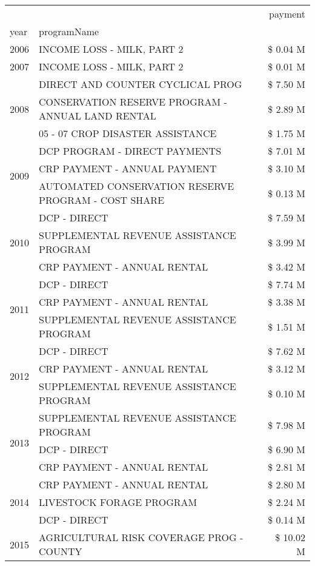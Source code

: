 \begin{tabular}{llr}
\toprule
 &  & payment \\
year & programName &  \\
\midrule
2006 & INCOME LOSS - MILK, PART 2 & \$ 0.04 M \\
\cline{1-3}
2007 & INCOME LOSS - MILK, PART 2 & \$ 0.01 M \\
\cline{1-3}
\multirow[t]{3}{*}{2008} & DIRECT AND COUNTER CYCLICAL PROG & \$ 7.50 M \\
 & CONSERVATION RESERVE PROGRAM - ANNUAL LAND RENTAL & \$ 2.89 M \\
 & 05 - 07 CROP DISASTER ASSISTANCE & \$ 1.75 M \\
\cline{1-3}
\multirow[t]{3}{*}{2009} & DCP PROGRAM - DIRECT PAYMENTS & \$ 7.01 M \\
 & CRP PAYMENT - ANNUAL PAYMENT & \$ 3.10 M \\
 & AUTOMATED CONSERVATION RESERVE PROGRAM - COST SHARE & \$ 0.13 M \\
\cline{1-3}
\multirow[t]{3}{*}{2010} & DCP - DIRECT & \$ 7.59 M \\
 & SUPPLEMENTAL REVENUE ASSISTANCE PROGRAM & \$ 3.99 M \\
 & CRP PAYMENT - ANNUAL RENTAL & \$ 3.42 M \\
\cline{1-3}
\multirow[t]{3}{*}{2011} & DCP - DIRECT & \$ 7.74 M \\
 & CRP PAYMENT - ANNUAL RENTAL & \$ 3.38 M \\
 & SUPPLEMENTAL REVENUE ASSISTANCE PROGRAM & \$ 1.51 M \\
\cline{1-3}
\multirow[t]{3}{*}{2012} & DCP - DIRECT & \$ 7.62 M \\
 & CRP PAYMENT - ANNUAL RENTAL & \$ 3.12 M \\
 & SUPPLEMENTAL REVENUE ASSISTANCE PROGRAM & \$ 0.10 M \\
\cline{1-3}
\multirow[t]{3}{*}{2013} & SUPPLEMENTAL REVENUE ASSISTANCE PROGRAM & \$ 7.98 M \\
 & DCP - DIRECT & \$ 6.90 M \\
 & CRP PAYMENT - ANNUAL RENTAL & \$ 2.81 M \\
\cline{1-3}
\multirow[t]{3}{*}{2014} & CRP PAYMENT - ANNUAL RENTAL & \$ 2.80 M \\
 & LIVESTOCK FORAGE PROGRAM & \$ 2.24 M \\
 & DCP - DIRECT & \$ 0.14 M \\
\cline{1-3}
\multirow[t]{3}{*}{2015} & AGRICULTURAL RISK COVERAGE PROG - COUNTY & \$ 10.02 M \\

\end{tabular}
